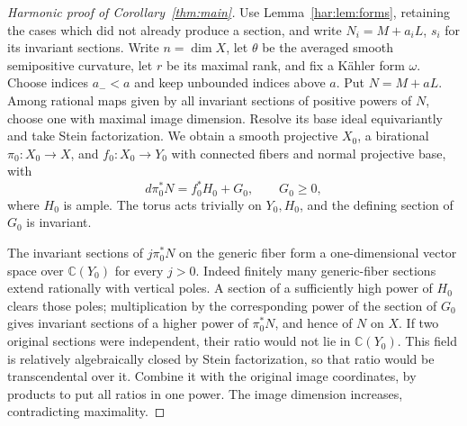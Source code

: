 \begin{proof}[Harmonic proof of Corollary~\ref{thm:main}]
Use Lemma~\ref{har:lem:forms}, retaining the cases which did not already
produce a section, and write \(N_i=M+a_iL\), \(s_i\) for its invariant
sections. Write \(n=\dim X\), let \(\theta\) be the averaged smooth
semipositive curvature, let \(r\) be its maximal rank, and fix a
K\"ahler form \(\omega\). Choose indices \(a_-<a\) and keep unbounded indices above
\(a\). Put \(N=M+aL\). Among rational maps given by all invariant
sections of positive powers of \(N\), choose one with maximal image
dimension. Resolve its base ideal equivariantly and take Stein
factorization. We obtain a smooth projective \(X_0\), a birational
\(\pi_0:X_0\to X\), and \(f_0:X_0\to Y_0\) with connected fibers and
normal projective base, with
\begin{equation}\label{har:eq:iitaka}
 d\pi_0^*N=f_0^*H_0+G_0,\qquad G_0\ge0,
\end{equation}
where \(H_0\) is ample. The torus acts trivially on \(Y_0,H_0\), and
the defining section of \(G_0\) is invariant.

The invariant sections of \(j\pi_0^*N\) on the generic fiber form a
one-dimensional vector space over \(\mathbb C(Y_0)\) for every \(j>0\).
Indeed finitely many generic-fiber sections extend rationally with
vertical poles. A section of a sufficiently high power of \(H_0\)
clears those poles; multiplication by the corresponding power of the
section of \(G_0\) gives invariant sections of a higher power of
\(\pi_0^*N\), and hence of \(N\) on \(X\). If two original sections
were independent, their ratio would not lie in \(\mathbb C(Y_0)\).
This field is relatively algebraically closed by Stein factorization,
so that ratio would be transcendental over it. Combine it with the
original image coordinates, by products to put all ratios in one
power. The image dimension increases, contradicting maximality.


\end{proof}
